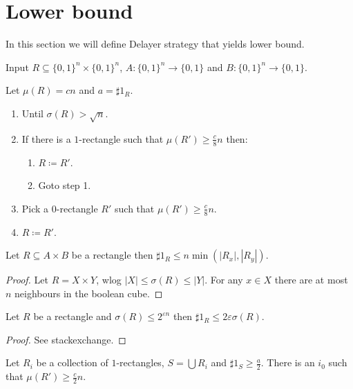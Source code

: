 \section{Lower bound}

In this section we will define Delayer strategy that yields lower bound.

\begin{algorithm}
    Input $R \subseteq \{0, 1\}^n \times \{0, 1\}^n$, $A:\{0, 1\}^n \to \{0, 1\}$ and $B:\{0, 1\}^n \to
    \{0, 1\}$.

    Let $\mu(R) = c n$ and $a = \sharp 1_R$.

    \begin{enumerate}
        \item Until $\sigma(R) > \sqrt{n}$.
        \item If there is a $1$-rectangle such that $\mu(R') \ge \frac{c}{8} n$ then:
            \begin{enumerate}
                \item $R \coloneqq R'$.
                \item Goto step 1.
            \end{enumerate}
            
        \item Pick a $0$-rectangle $R'$ such that $\mu(R') \ge \frac{c}{8} n$.
        \item $R \coloneqq R'$.
    \end{enumerate}
\end{algorithm}

\begin{lemma}
    Let $R \subseteq A \times B$ be a rectangle then $\sharp 1_R \le n \min(|R_x|, |R_y|)$.
\end{lemma}

\begin{proof}
    Let $R = X \times Y$, wlog $|X| \le \sigma(R) \le |Y|$. For any $x \in X$ there are at most $n$
    neighbours in the boolean cube.
\end{proof}

\begin{lemma}
    \label{lm:ones-in-small}
    Let $R$ be a rectangle and $\sigma(R) \le 2^{\varepsilon n}$ then $\sharp 1_R \le 2 \varepsilon \sigma(R)$.
\end{lemma}

\begin{proof}
    See stackexchange.
\end{proof}


\begin{lemma}
    Let $R_i$ be a collection of $1$-rectangles, $S = \bigcup R_i$ and $\sharp 1_{S} \ge
    \frac{a}{2}$. There is an $i_0$ such that $\mu(R') \ge \frac{c}{2} n$.
\end{lemma}

